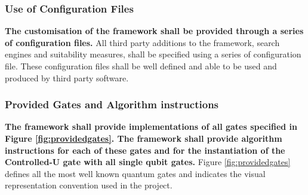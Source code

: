 \documentclass[authoryearcitations]{UoYCSproject}
\begin{document}
\subsubsection{Use of Configuration Files}
\textbf{The customisation of the framework shall be provided through a series of configuration files.}
All third party additions to the framework, search engines and suitability measures, shall be specified using a series of configuration file.
These configuration files shall be well defined and able to be used and produced by third party software.

\subsubsection{Provided Gates and Algorithm instructions}
\textbf{The framework shall provide implementations of all gates specified in Figure \ref{fig:providedgates}.
The framework shall provide algorithm instructions for each of these gates and for the instantiation of the Controlled-U gate with all single qubit gates.}
Figure \ref{fig:providedgates} defines all the most well known quantum gates and indicates the visual representation convention used in the project.
\end{document}
